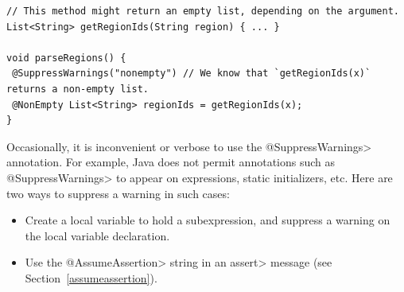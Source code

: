 \begin{Verbatim}
// This method might return an empty list, depending on the argument.
List<String> getRegionIds(String region) { ... }

void parseRegions() {
 @SuppressWarnings("nonempty") // We know that `getRegionIds(x)` returns a non-empty list.
 @NonEmpty List<String> regionIds = getRegionIds(x);
}
\end{Verbatim}


Occasionally, it is inconvenient or verbose to use the \<@SuppressWarnings>
annotation.
For example, Java does not permit annotations such as \<@SuppressWarnings> to
appear on expressions, static initializers, etc.
Here are two ways to suppress a warning in such cases:

\begin{itemize}
\item
  Create a local variable to hold a subexpression, and
  suppress a warning on the local variable declaration.
\item
  Use the \<@AssumeAssertion> string in
  an \<assert> message (see Section~\ref{assumeassertion}).
\end{itemize}
